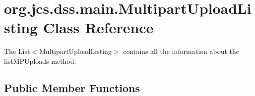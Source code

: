 \hypertarget{classorg_1_1jcs_1_1dss_1_1main_1_1MultipartUploadListing}{}\section{org.\+jcs.\+dss.\+main.\+Multipart\+Upload\+Listing Class Reference}
\label{classorg_1_1jcs_1_1dss_1_1main_1_1MultipartUploadListing}


The List$<$\+Multipart\+Upload\+Listing$>$ contains all the information about the list\+M\+P\+Uploads method.  


\subsection*{Public Member Functions}
